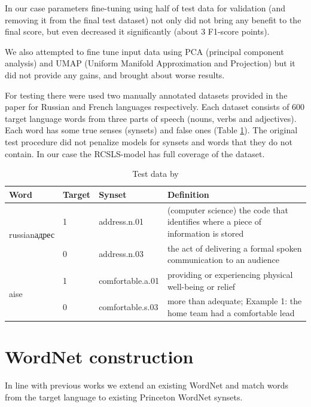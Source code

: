 \documentclass[11pt,a4paper]{article}
\begin{document}
In our case parameters fine-tuning using half of test data for validation (and removing it from the final test dataset) not only did not bring any benefit to the final score, but even decreased it significantly (about 3 F1-score points).

We also attempted to fine tune input data using PCA (principal component analysis) and UMAP (Uniform Manifold Approximation and Projection) \cite{umap} but it did not provide any gains, and brought about worse results.

For testing there were used two manually annotated datasets provided in the paper \cite{Khodak2017} for Russian and French languages respectively. Each dataset consists of 600 target language words from three parts of speech (nouns, verbs and adjectives). Each word has some true senses (synsets) and false ones (Table \ref{wordnet-test-data}). The original test procedure did not penalize models for synsets and words that they do not contain. In our case the RCSLS-model has full coverage of the dataset.

\begin{table}[!htbp]
	\small
	\caption{Test data by \cite{Khodak2017}}
	\label{wordnet-test-data}		
	\centering
	\begin{tabular}{l l l l}
		\hline
		Word & Target &  Synset & Definition \\ \hline
		\multirow{2}{*}{\begin{otherlanguage*}{russian}адрес \end{otherlanguage*}}
		& \multicolumn{1}{l}{1} & \multicolumn{1}{l}{address.n.01} & \multicolumn{1}{l}{(computer science) the code that identifies where a piece of information is stored} \\
		& \multicolumn{1}{l}{0} & \multicolumn{1}{l}{address.n.03} & \multicolumn{1}{l}{the act of delivering a formal spoken communication to an audience} \\
		\hline
		\multirow{2}{*}{aise}
		& \multicolumn{1}{l}{1} & \multicolumn{1}{l}{comfortable.a.01} & \multicolumn{1}{l}{providing or experiencing physical well-being or relief} \\
		& \multicolumn{1}{l}{0} & \multicolumn{1}{l}{comfortable.s.03} & \multicolumn{1}{l}{more than adequate; Example 1: the home team had a comfortable lead} \\
		\hline
	\end{tabular}
	
\end{table}


\section{WordNet construction}
In line with previous works \cite{Vossen1998,tufis2006romanian} we extend an existing WordNet and match words from the target language to existing Princeton WordNet synsets.
\end{document}
